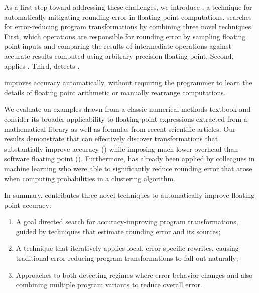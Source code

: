 \documentclass[paper.tex]{subfiles}
\begin{document}
As a first step toward addressing these challenges, we introduce
\casio, a technique for automatically mitigating rounding error in
floating point computations.  \casio searches for error-reducing
program transformations by combining three novel techniques.  First,
\casio {} which operations are responsible
for rounding error by sampling floating point inputs and comparing the
results of intermediate operations against accurate results computed
using arbitrary precision floating point.  Second, \casio applies
. Third, \casio detects .

 \casio improves
accuracy automatically, without requiring the programmer to learn the
details of floating point arithmetic or manually rearrange
computations.

We evaluate \casio on examples drawn from a classic numerical methods
textbook and consider its broader applicability to floating point
expressions extracted from a mathematical library as well as formulas
from recent scientific articles.  Our results demonstrate that \casio
can effectively discover transformations that substantially improve
accuracy () while imposing much lower
overhead than software floating point ().  Furthermore, \casio has already been applied by colleagues
in machine learning who were able to significantly reduce rounding
error that arose when computing probabilities in a clustering
algorithm.

 In summary, \casio
contributes three novel techniques to automatically improve floating
point accuracy:
\begin{enumerate}
\item A goal directed search for accuracy-improving program
  transformations, guided by techniques that estimate rounding error
  and its sources;
\item A technique that iteratively applies local, error-specific
  rewrites, causing traditional error-reducing program transformations
  to fall out naturally;
\item Approaches to both detecting regimes where error behavior
  changes and also combining multiple program variants to reduce
  overall error.
\end{enumerate}
\end{document}
